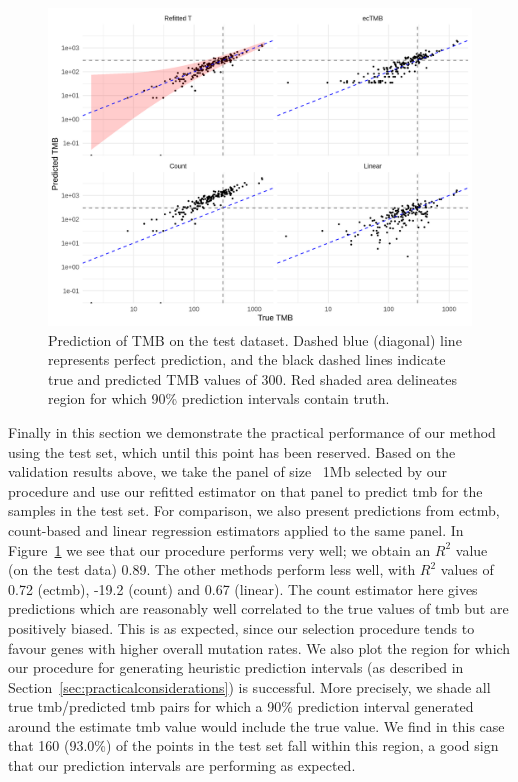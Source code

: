 \documentclass[10pt,twoside,openright]{report}
\begin{document}
\begin{figure}[htbp]
\centering
\includegraphics[width=6in]{OneMBPanelPredictions.png}
\vspace*{-5mm}
\caption{Prediction of TMB on the test dataset. Dashed blue (diagonal) line represents perfect prediction, and the black dashed lines indicate true and predicted TMB values of 300. Red shaded area delineates region for which 90\% prediction intervals contain truth.
\label{fig:OneMBPredictions}}
\vspace*{-2mm}
\end{figure} 

Finally in this section we demonstrate the practical performance of our method using the test set, which until this point has been reserved. Based on the validation results above, we take the panel of size ~1Mb selected by our procedure and use our refitted estimator on that panel to predict \acrshort{tmb} for the samples in the test set. For comparison, we also present predictions from \acrshort{ectmb}, count-based and linear regression estimators applied to the same panel. In Figure~\ref{fig:OneMBPredictions} we see that our procedure performs very well; we obtain an $R^2$ value (on the test data) 0.89.  The other methods perform less well, with $R^2$ values of 0.72 (\acrshort{ectmb}), -19.2 (count) and 0.67 (linear). The count estimator here gives predictions which are reasonably well correlated to the true values of \acrshort{tmb} but are positively biased. This is as expected, since our selection procedure tends to favour genes with higher overall mutation rates. We also plot the region for which our procedure for generating heuristic prediction intervals (as described in Section~\ref{sec:practicalconsiderations}) is successful. More precisely, we shade all true \acrshort{tmb}/predicted \acrshort{tmb} pairs for which a 90\% prediction interval generated around the estimate \acrshort{tmb} value would include the true value. We find in this case that 160 (93.0\%) of the points in the test set fall within this region, a good sign that our prediction intervals are performing as expected.
\end{document}
